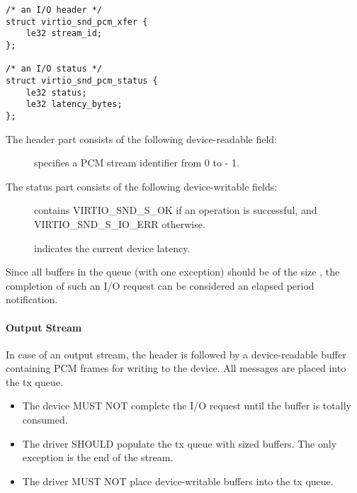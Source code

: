 \begin{lstlisting}
/* an I/O header */
struct virtio_snd_pcm_xfer {
    le32 stream_id;
};

/* an I/O status */
struct virtio_snd_pcm_status {
    le32 status;
    le32 latency_bytes;
};
\end{lstlisting}

The header part consists of the following device-readable field:

\begin{description}
\item[] specifies a PCM stream identifier from 0 to  - 1.
\end{description}

The status part consists of the following device-writable fields:

\begin{description}
\item[] contains VIRTIO_SND_S_OK if an operation is successful,
and VIRTIO_SND_S_IO_ERR otherwise.
\item[] indicates the current device latency.
\end{description}

Since all buffers in the queue (with one exception) should be of the size
, the completion of such an I/O request can be considered an
elapsed period notification.

\paragraph{Output Stream}

In case of an output stream, the header is followed by a device-readable buffer
containing PCM frames for writing to the device. All messages are placed into
the tx queue.


\begin{itemize}
\item The device MUST NOT complete the I/O request until the buffer is totally
consumed.
\end{itemize}


\begin{itemize}
\item The driver SHOULD populate the tx queue with  sized
buffers. The only exception is the end of the stream.
\item The driver MUST NOT place device-writable buffers into the tx queue.
\end{itemize}

